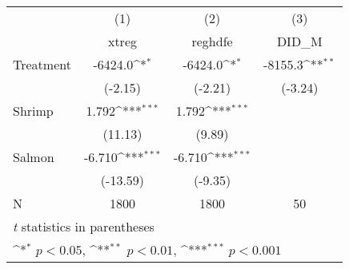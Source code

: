 {
\def\sym#1{\ifmmode^{#1}\else\(^{#1}\)\fi}
\begin{tabular}{l*{3}{c}}
\hline\hline
                    &\multicolumn{1}{c}{(1)}&\multicolumn{1}{c}{(2)}&\multicolumn{1}{c}{(3)}\\
                    &\multicolumn{1}{c}{xtreg}&\multicolumn{1}{c}{reghdfe}&\multicolumn{1}{c}{DID\_M}\\
\hline
Treatment           &     -6424.0\sym{*}  &     -6424.0\sym{*}  &     -8155.3\sym{**} \\
                    &     (-2.15)         &     (-2.21)         &     (-3.24)         \\
[1em]
Shrimp              &       1.792\sym{***}&       1.792\sym{***}&                     \\
                    &     (11.13)         &      (9.89)         &                     \\
[1em]
Salmon              &      -6.710\sym{***}&      -6.710\sym{***}&                     \\
                    &    (-13.59)         &     (-9.35)         &                     \\
\hline
N                   &        1800         &        1800         &          50         \\
\hline\hline
\multicolumn{4}{l}{\footnotesize \textit{t} statistics in parentheses}\\
\multicolumn{4}{l}{\footnotesize \sym{*} \(p<0.05\), \sym{**} \(p<0.01\), \sym{***} \(p<0.001\)}\\
\end{tabular}
}
